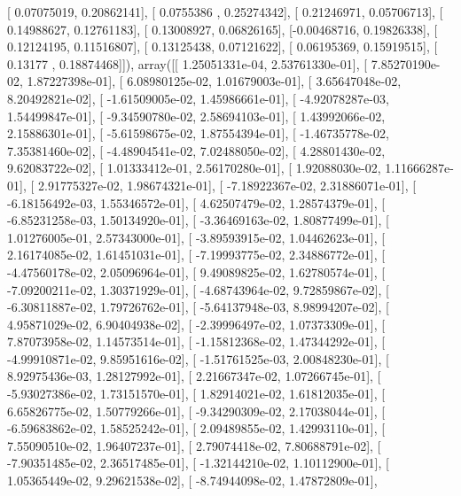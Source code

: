 \documentclass{article}
\begin{document}
       [ 0.07075019,  0.20862141],
       [ 0.0755386 ,  0.25274342],
       [ 0.21246971,  0.05706713],
       [ 0.14988627,  0.12761183],
       [ 0.13008927,  0.06826165],
       [-0.00468716,  0.19826338],
       [ 0.12124195,  0.11516807],
       [ 0.13125438,  0.07121622],
       [ 0.06195369,  0.15919515],
       [ 0.13177   ,  0.18874468]]), array([[  1.25051331e-04,   2.53761330e-01],
       [  7.85270190e-02,   1.87227398e-01],
       [  6.08980125e-02,   1.01679003e-01],
       [  3.65647048e-02,   8.20492821e-02],
       [ -1.61509005e-02,   1.45986661e-01],
       [ -4.92078287e-03,   1.54499847e-01],
       [ -9.34590780e-02,   2.58694103e-01],
       [  1.43992066e-02,   2.15886301e-01],
       [ -5.61598675e-02,   1.87554394e-01],
       [ -1.46735778e-02,   7.35381460e-02],
       [ -4.48904541e-02,   7.02488050e-02],
       [  4.28801430e-02,   9.62083722e-02],
       [  1.01333412e-01,   2.56170280e-01],
       [  1.92088030e-02,   1.11666287e-01],
       [  2.91775327e-02,   1.98674321e-01],
       [ -7.18922367e-02,   2.31886071e-01],
       [ -6.18156492e-03,   1.55346572e-01],
       [  4.62507479e-02,   1.28574379e-01],
       [ -6.85231258e-03,   1.50134920e-01],
       [ -3.36469163e-02,   1.80877499e-01],
       [  1.01276005e-01,   2.57343000e-01],
       [ -3.89593915e-02,   1.04462623e-01],
       [  2.16174085e-02,   1.61451031e-01],
       [ -7.19993775e-02,   2.34886772e-01],
       [ -4.47560178e-02,   2.05096964e-01],
       [  9.49089825e-02,   1.62780574e-01],
       [ -7.09200211e-02,   1.30371929e-01],
       [ -4.68743964e-02,   9.72859867e-02],
       [ -6.30811887e-02,   1.79726762e-01],
       [ -5.64137948e-03,   8.98994207e-02],
       [  4.95871029e-02,   6.90404938e-02],
       [ -2.39996497e-02,   1.07373309e-01],
       [  7.87073958e-02,   1.14573514e-01],
       [ -1.15812368e-02,   1.47344292e-01],
       [ -4.99910871e-02,   9.85951616e-02],
       [ -1.51761525e-03,   2.00848230e-01],
       [  8.92975436e-03,   1.28127992e-01],
       [  2.21667347e-02,   1.07266745e-01],
       [ -5.93027386e-02,   1.73151570e-01],
       [  1.82914021e-02,   1.61812035e-01],
       [  6.65826775e-02,   1.50779266e-01],
       [ -9.34290309e-02,   2.17038044e-01],
       [ -6.59683862e-02,   1.58525242e-01],
       [  2.09489855e-02,   1.42993110e-01],
       [  7.55090510e-02,   1.96407237e-01],
       [  2.79074418e-02,   7.80688791e-02],
       [ -7.90351485e-02,   2.36517485e-01],
       [ -1.32144210e-02,   1.10112900e-01],
       [  1.05365449e-02,   9.29621538e-02],
       [ -8.74944098e-02,   1.47872809e-01],
\end{document}
